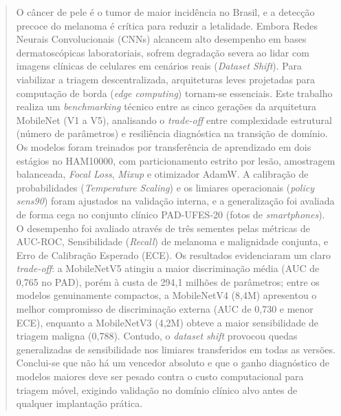 \documentclass[oneside,english,brazilian]{UNISINOSmonografia}
\begin{document}
%
\begin{abstract}
O câncer de pele é o tumor de maior incidência no Brasil, e a detecção precoce do melanoma é crítica para reduzir a letalidade. Embora Redes Neurais Convolucionais (CNNs) alcancem alto desempenho em bases dermatoscópicas laboratoriais, sofrem degradação severa ao lidar com imagens clínicas de celulares em cenários reais (\textit{Dataset Shift}). Para viabilizar a triagem descentralizada, arquiteturas leves projetadas para computação de borda (\textit{edge computing}) tornam-se essenciais. Este trabalho realiza um \textit{benchmarking} técnico entre as cinco gerações da arquitetura MobileNet (V1 a V5), analisando o \textit{trade-off} entre complexidade estrutural (número de parâmetros) e resiliência diagnóstica na transição de domínio. Os modelos foram treinados por transferência de aprendizado em dois estágios no HAM10000, com particionamento estrito por lesão, amostragem balanceada, \textit{Focal Loss}, \textit{Mixup} e otimizador AdamW. A calibração de probabilidades (\textit{Temperature Scaling}) e os limiares operacionais (\textit{policy sens90}) foram ajustados na validação interna, e a generalização foi avaliada de forma cega no conjunto clínico PAD-UFES-20 (fotos de \textit{smartphones}). O desempenho foi avaliado através de três sementes pelas métricas de AUC-ROC, Sensibilidade (\textit{Recall}) de melanoma e malignidade conjunta, e Erro de Calibração Esperado (ECE). Os resultados evidenciaram um claro \textit{trade-off}: a MobileNetV5 atingiu a maior discriminação média (AUC de 0,765 no PAD), porém à custa de 294,1 milhões de parâmetros; entre os modelos genuinamente compactos, a MobileNetV4 (8,4M) apresentou o melhor compromisso de discriminação externa (AUC de 0,730 e menor ECE), enquanto a MobileNetV3 (4,2M) obteve a maior sensibilidade de triagem maligna (0,788). Contudo, o \textit{dataset shift} provocou quedas generalizadas de sensibilidade nos limiares transferidos em todas as versões. Conclui-se que não há um vencedor absoluto e que o ganho diagnóstico de modelos maiores deve ser pesado contra o custo computacional para triagem móvel, exigindo validação no domínio clínico alvo antes de qualquer implantação prática.
\end{abstract}
\end{document}
